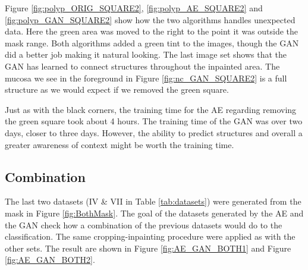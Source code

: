  
Figure \ref{fig:polyp_ORIG_SQUARE2}, \ref{fig:polyp_AE_SQUARE2} and \ref{fig:polyp_GAN_SQUARE2} show how the two algorithms handles unexpected data. Here the green area was moved to the right to the point it was outside the mask range. Both algorithms added a green tint to the images, though the GAN did a better job making it natural looking. 
The last image set shows that the GAN has learned to connect structures throughout the inpainted area. The mucosa we see in the foreground in Figure \ref{fig:nc_GAN_SQUARE2} is a full structure as we would expect if we removed the green square.
 


\vspace{5px}
\noindent Just as with the black corners, the training time for the AE regarding removing the green square took about 4 hours. 
The training time of the GAN was over two days, closer to three days. However, the ability to predict structures and overall a greater awareness of context might be worth the training time.

\FloatBarrier
\subsection{Combination}
The last two datasets (IV \& VII in Table \ref{tab:datasets}) were generated from the mask in Figure \ref{fig:BothMask}. The goal of the datasets generated by the AE and the GAN check how a combination of the previous datasets would do to the classification. The same cropping-inpainting procedure were applied as with the other sets. The result are shown in Figure \ref{fig:AE_GAN_BOTH1} and Figure \ref{fig:AE_GAN_BOTH2}.

